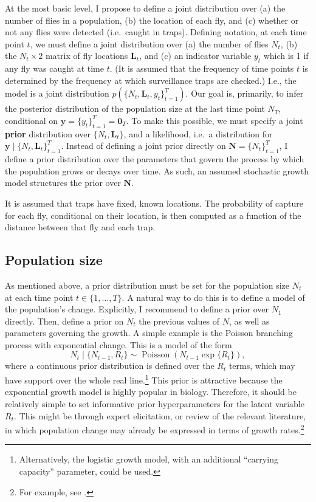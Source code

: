 \documentclass[
  oneside]{book}
\begin{document}
At the most basic level, I propose to define a joint distribution over (a) the number of flies in a population, (b) the location of each fly, and (c) whether or not any flies were detected (i.e.~caught in traps). Defining notation, at each time point \(t\), we must define a joint distribution over (a) the number of flies \(N_t\), (b) the \(N_t \times 2\) matrix of fly locations \(\mathbf L_t\), and (c) an indicator variable \(y_t\) which is 1 if any fly was caught at time \(t\). (It is assumed that the frequency of time points \(t\) is determined by the frequency at which surveillance traps are checked.) I.e., the model is a joint distribution \(p(\{N_t, \mathbf L_t, y_t\}_{t=1}^T)\). Our goal is, primarily, to infer the posterior distribution of the population size at the last time point \(N_T\), conditional on \(\mathbf y = \{y_t\}_{t=1}^T = \mathbf 0_T\). To make this possible, we must specify a joint \textbf{prior} distribution over \(\{N_t, \mathbf L_t\}\), and a likelihood, i.e.~a distribution for \(\mathbf y \mid \{N_t, \mathbf L_t\}_{t=1}^T\). Instead of defining a joint prior directly on \(\mathbf N = \{N_t\}_{t=1}^T\), I define a prior distribution over the parameters that govern the process by which the population grows or decays over time. As such, an assumed stochastic growth model structures the prior over \(\mathbf N\).

It is assumed that traps have fixed, known locations. The probability of capture for each fly, conditional on their location, is then computed as a function of the distance between that fly and each trap.

\hypertarget{population-size}{%
\subsection{Population size}\label{population-size}}

As mentioned above, a prior distribution must be set for the population size \(N_t\) at each time point \(t \in \{1, \ldots, T\}\). A natural way to do this is to define a model of the population's change. Explicitly, I recommend to define a prior over \(N_1\) directly. Then, define a prior on \(N_t\) the previous values of \(N\), as well as parameters governing the growth. A simple example is the Poisson branching process with exponential change. This is a model of the form
\[
N_t \mid \{N_{t-1}, R_t\} \sim \operatorname{Poisson}(N_{t-1} \exp \{R_t\}),
\]
where a continuous prior distribution is defined over the \(R_t\) terms, which may have support over the whole real line.\footnote{Alternatively, the logistic growth model, with an additional ``carrying capacity'' parameter, could be used.} This prior is attractive because the exponential growth model is highly popular in biology. Therefore, it should be relatively simple to set informative prior hyperparameters for the latent variable \(R_t\). This might be through expert elicitation, or review of the relevant literature, in which population change may already be expressed in terms of growth rates.\footnote{For example, see \citet{papadopoulos2002}.}
\end{document}
